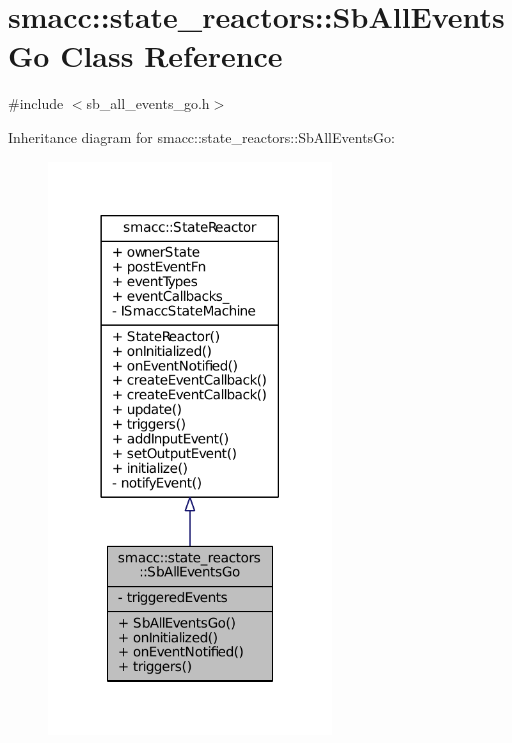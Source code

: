 \hypertarget{classsmacc_1_1state__reactors_1_1SbAllEventsGo}{}\section{smacc\+:\+:state\+\_\+reactors\+:\+:Sb\+All\+Events\+Go Class Reference}
\label{classsmacc_1_1state__reactors_1_1SbAllEventsGo}


{\ttfamily \#include $<$sb\+\_\+all\+\_\+events\+\_\+go.\+h$>$}



Inheritance diagram for smacc\+:\+:state\+\_\+reactors\+:\+:Sb\+All\+Events\+Go\+:
\nopagebreak
\begin{figure}[H]
\begin{center}
\leavevmode
\includegraphics[width=213pt]{classsmacc_1_1state__reactors_1_1SbAllEventsGo__inherit__graph}
\end{center}
\end{figure}


